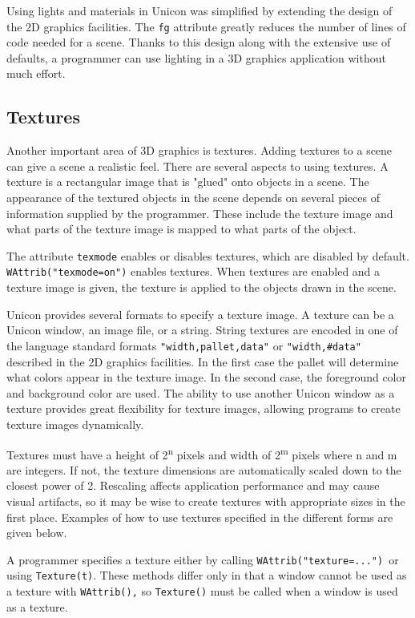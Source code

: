 Using lights and materials in Unicon was simplified by extending the
design of the 2D graphics facilities. The \texttt{fg} attribute
greatly reduces the number of lines of code needed for a scene. Thanks
to this design along with the extensive use of defaults, a programmer
can use lighting in a 3D graphics application without much effort.

\subsection{Textures}

Another important area of 3D graphics is textures.  Adding textures to
a scene can give a scene a realistic feel.  There are several aspects
to using textures. A texture is a rectangular image that is "glued"
onto objects in a scene. The appearance of the textured objects in the
scene depends on several pieces of information supplied by the
programmer. These include the texture image and what parts of the
texture image is mapped to what parts of the object.

The attribute \texttt{texmode} enables or disables textures, which are
disabled by default.  \texttt{WAttrib("texmode=on")} enables textures.
When textures are enabled and a texture image is given, the texture is
applied to the objects drawn in the scene.

Unicon provides several formats to specify a texture image. A texture
can be a Unicon window, an image file, or a string. String textures
are encoded in one of the language standard formats
\texttt{"width,pallet,data"} or \texttt{"width,\#data"} described in
the 2D graphics facilities. In the first case the pallet will
determine what colors appear in the texture image. In the second case,
the foreground color and background color are used. The ability to use
another Unicon window as a texture provides great flexibility for
texture images, allowing programs to create texture images
dynamically.

Textures must have a height of 2\textsuperscript{n} pixels and width
of 2\textsuperscript{m} pixels where n and m are integers. If not, the
texture dimensions are automatically scaled down to the closest power
of 2. Rescaling affects application performance and may cause visual
artifacts, so it may be wise to create textures with appropriate sizes
in the first place. Examples of how to use textures specified in the
different forms are given below.

A programmer specifies a texture either by calling
\texttt{WAttrib("texture=...")}\texttt{ }or using
\texttt{Texture(t)}. These methods differ only in that a window cannot
be used as a texture with \texttt{WAttrib(),} so \texttt{Texture()}
must be called when a window is used as a texture.

